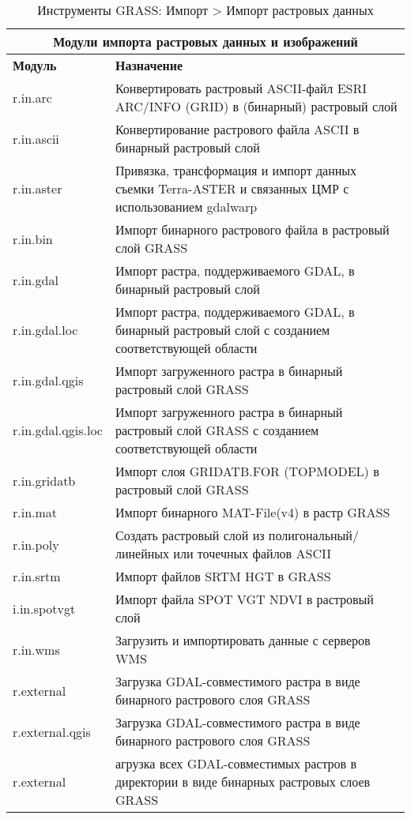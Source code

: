 {\renewcommand{\arraystretch}{0.7}
\begin{table}[H]
\centering
 \begin{tabular}{|p{2.5cm}|p{11.5cm}|}
  \hline \multicolumn{2}{|c|}{\textbf{Модули импорта растровых данных и изображений}} \\
  \hline \textbf{Модуль} & \textbf{Назначение} \\
  \hline r.in.arc & Конвертировать растровый ASCII-файл ESRI ARC/INFO (GRID)
  в (бинарный) растровый слой \\
  \hline r.in.ascii & Конвертирование растрового файла ASCII в бинарный
  растровый слой \\
  \hline r.in.aster & Привязка, трансформация и импорт данных съемки
  Terra-ASTER и связанных ЦМР с использованием gdalwarp \\
  \hline r.in.bin & Импорт бинарного растрового файла в растровый слой
  GRASS \\
  \hline r.in.gdal & Импорт растра, поддерживаемого GDAL, в бинарный
  растровый слой \\
  \hline r.in.gdal.loc & Импорт растра, поддерживаемого GDAL, в бинарный
  растровый слой с созданием соответствующей области \\
  \hline r.in.gdal.qgis & Импорт загруженного растра в бинарный
  растровый слой GRASS \\
  \hline r.in.gdal.qgis.loc & Импорт загруженного растра в бинарный
  растровый слой GRASS с созданием соответствующей области \\
  \hline r.in.gridatb & Импорт слоя GRIDATB.FOR (TOPMODEL) в растровый
  слой GRASS \\
  \hline r.in.mat & Импорт бинарного MAT-File(v4) в растр GRASS \\
  \hline r.in.poly & Создать растровый слой из полигональный/линейных
  или точечных файлов ASCII \\
  \hline r.in.srtm & Импорт файлов SRTM HGT в GRASS \\
  \hline i.in.spotvgt & Импорт файла SPOT VGT NDVI в растровый слой \\
  \hline r.in.wms & Загрузить и импортировать данные с серверов WMS \\
  \hline r.external & Загрузка GDAL-совместимого растра в виде бинарного
  растрового слоя GRASS \\
  \hline r.external.qgis & Загрузка GDAL-совместимого растра в виде бинарного
  растрового слоя GRASS \\
  \hline r.external & агрузка всех GDAL-совместимых растров в директории
  в виде бинарных растровых слоев GRASS \\
  \hline
\end{tabular}
\caption{Инструменты GRASS: Импорт > Импорт растровых данных}
\end{table}}


